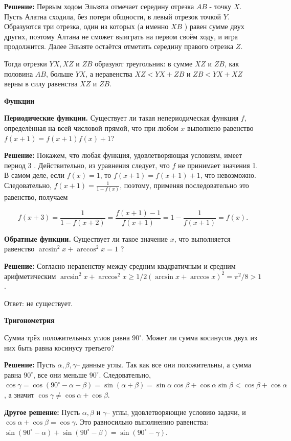 \textbf{Решение:}
Первым ходом Эльзята отмечает середину отрезка $A B$ - точку $X$. Пусть Алатна сходила, без потери общности, в левый отрезок точкой $Y$. Образуются три отрезка, один из которых (а именно $X B$ ) равен сумме двух других, поэтому Алтана не сможет выиграть на первом своём ходу, и игра продолжится. Далее Эльзяте остаётся отметить середину правого отрезка $Z$.

Тогда отрезки $Y X, X Z$ и $Z B$ образуют треугольник: в сумме $X Z$ и $Z B$, как половина $A B$, больше $Y X$, а неравенства $X Z<Y X+Z B$ и $Z B<Y X+X Z$ верны в силу равенства $X Z$ и $Z B$.

\textbf{\large Функции}

\textbf{Периодические функции.}
Существует ли такая непериодическая функция $f$, определённая на всей числовой прямой, что при любом $x$ выполнено равенство $f(x+1)=f(x+1) f(x)+1$?

\textbf{Решение:}
Покажем, что любая функция, удовлетворяющая условиям, имеет период 3 . Действительно, из уравнения следует, что $f$ не принимает значения 1. В самом деле, если $f(x)=1$, то $f(x+1)=f(x+1)+1$, что невозможно. Следовательно, $f(x+1)=\frac{1}{1-f(x)}$, поэтому, применяя последовательно это равенство, получаем

$$
f(x+3)=\frac{1}{1-f(x+2)}=\frac{f(x+1)-1}{f(x+1)}=1-\frac{1}{f(x+1)}=f(x) .
$$

\textbf{Обратные функции.}
Существует ли такое значение $x$, что выполняется равенство $\arcsin ^2 x+\arccos ^2 x=1$ ?

\textbf{Решение:}
Согласно неравенству между средним квадратичным и средним арифметическим $\arcsin ^2 x+\arccos ^2 x \geq 1 / 2(\arcsin x+\arccos x)^2=\pi^2 / 8>1$.

Ответ: не существует.

\textbf{\large Тригонометрия}


Сумма трёх положительных углов равна $90^{\circ}$. Может ли сумма косинусов двух из них быть равна косинусу третьего?

\textbf{Решение:}
Пусть $\alpha, \beta, \gamma$-- данные углы. Так как все они положительны, а сумма равна $90^{\circ}$, все они меньше $90^{\circ}$. Следовательно, $\cos \gamma=\cos \left(90^{\circ}-\alpha-\beta\right)= \sin (\alpha+\beta)=\sin \alpha \cos \beta+\cos \alpha \sin \beta<\cos \beta+\cos \alpha$, а значит $\cos \gamma \neq \cos \alpha+\cos \beta$.

\textbf{Другое решение:} Пусть $\alpha, \beta$ и $\gamma$-- углы, удовлетворяющие условию задачи, и $\cos \alpha+\cos \beta=\cos \gamma$. Это равносильно выполнению равенства: $\sin \left(90^{\circ}-\alpha\right)+\sin \left(90^{\circ}-\beta\right)=\sin \left(90^{\circ}-\gamma\right)$.

